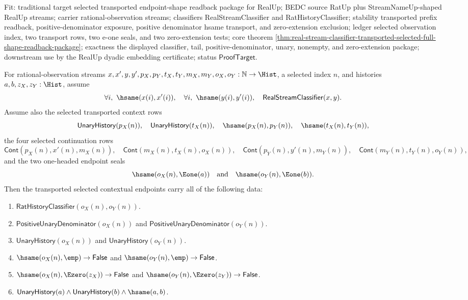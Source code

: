 Fit: traditional target selected transported endpoint-shape readback package for
RealUp; BEDC source RatUp plus StreamNameUp-shaped RealUp streams; carrier
rational-observation streams; classifiers RealStreamClassifier and
RatHistoryClassifier; stability transported prefix readback,
positive-denominator exposure, positive denominator hsame transport, and
zero-extension exclusion; ledger selected observation index, two transport rows,
two e-one seals, and two zero-extension tests; core theorem
\autoref{thm:real-stream-classifier-transported-selected-full-shape-readback-package};
exactness the displayed classifier, tail, positive-denominator, unary, nonempty,
and zero-extension package; downstream use by the RealUp dyadic embedding
certificate; status $\mathsf{ProofTarget}$.

\begin{theorem}
\label{thm:real-stream-classifier-transported-contextual-full-endpoint-package}
For rational-observation streams
$x,x',y,y',p_X,p_Y,t_X,t_Y,m_X,m_Y,o_X,o_Y:\mathbb{N}\to\Hist$, a selected
index $n$, and histories $a,b,z_X,z_Y:\Hist$, assume
$$
\forall i,\ \hsame(x(i),x'(i)),\quad
\forall i,\ \hsame(y(i),y'(i)),\quad
\mathsf{RealStreamClassifier}(x,y).
$$
Assume also the selected transported context rows
$$
\mathsf{UnaryHistory}(p_X(n)),\quad
\mathsf{UnaryHistory}(t_X(n)),\quad
\hsame(p_X(n),p_Y(n)),\quad
\hsame(t_X(n),t_Y(n)),
$$
the four selected continuation rows
$$
\mathsf{Cont}(p_X(n),x'(n),m_X(n)),\quad
\mathsf{Cont}(m_X(n),t_X(n),o_X(n)),
\quad
\mathsf{Cont}(p_Y(n),y'(n),m_Y(n)),\quad
\mathsf{Cont}(m_Y(n),t_Y(n),o_Y(n)),
$$
and the two one-headed endpoint seals
$$
\hsame(o_X(n),\Eone(a))\quad\text{and}\quad \hsame(o_Y(n),\Eone(b)).
$$
Then the transported selected contextual endpoints carry all of the following
data:
\begin{enumerate}
\item $\mathsf{RatHistoryClassifier}(o_X(n),o_Y(n))$.
\item $\mathsf{PositiveUnaryDenominator}(o_X(n))$ and
$\mathsf{PositiveUnaryDenominator}(o_Y(n))$.
\item $\mathsf{UnaryHistory}(o_X(n))$ and $\mathsf{UnaryHistory}(o_Y(n))$.
\item $\hsame(o_X(n),\emp)\to\mathsf{False}$ and
$\hsame(o_Y(n),\emp)\to\mathsf{False}$.
\item $\hsame(o_X(n),\Ezero(z_X))\to\mathsf{False}$ and
$\hsame(o_Y(n),\Ezero(z_Y))\to\mathsf{False}$.
\item $\mathsf{UnaryHistory}(a)\land\mathsf{UnaryHistory}(b)\land\hsame(a,b)$.
\end{enumerate}
\end{theorem}
